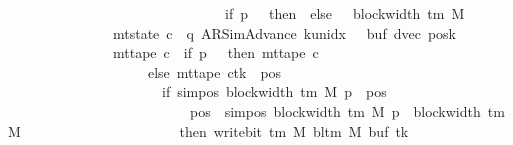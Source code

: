 \begin{isabellebody}
\ \ \ \ \ \ \ \ \ \ \ \ \ \ \ \ \ \ \ \ \ \ \ \ \ \ \ \ \ \ {\isacharcircum}{\kern0pt}{\isacharcircum}{\kern0pt}\ {\isacharparenleft}{\kern0pt}if\ p\ {\isacharequal}{\kern0pt}\ {}\ then\ {}\ else\ {}\ {\isacharasterisk}{\kern0pt}\ block{\isacharunderscore}{\kern0pt}width\ {\isacharparenleft}{\kern0pt}{\isasymGamma}{\isacharunderscore}{\kern0pt}tm\ M{\isacharparenright}{\kern0pt}{\isacharparenright}{\kern0pt}\isanewline
\ \ \ \ \ \ \ \ \ \ \ \ \ \ {\isasymand}\ mt{\isacharunderscore}{\kern0pt}state\ c{\isacharprime}{\kern0pt}{\isacharprime}{\kern0pt}\ {\isacharequal}{\kern0pt}\ {\isacharparenleft}{\kern0pt}q{\isacharcomma}{\kern0pt}\ AR{\isacharunderscore}{\kern0pt}SimAdvance{\isacharcomma}{\kern0pt}\ k{\isacharunderscore}{\kern0pt}unidx\ {}{\isacharcomma}{\kern0pt}\ {}{\isacharcomma}{\kern0pt}\ buf{\isacharcomma}{\kern0pt}\ dvec{\isacharcomma}{\kern0pt}\ posk{\isacharparenright}{\kern0pt}\isanewline
\ \ \ \ \ \ \ \ \ \ \ \ \ \ {\isasymand}\ mt{\isacharunderscore}{\kern0pt}tape\ c{\isacharprime}{\kern0pt}{\isacharprime}{\kern0pt}\ {\isacharequal}{\kern0pt}\ {\isacharparenleft}{\kern0pt}if\ p\ {\isacharequal}{\kern0pt}\ {}\ then\ mt{\isacharunderscore}{\kern0pt}tape\ c{\isacharprime}{\kern0pt}\isanewline
\ \ \ \ \ \ \ \ \ \ \ \ \ \ \ \ \ \ \ \ else\ {\isacharparenleft}{\kern0pt}mt{\isacharunderscore}{\kern0pt}tape\ c{\isacharprime}{\kern0pt}{\isacharparenright}{\kern0pt}{\isacharparenleft}{\kern0pt}tk\ {\isacharcolon}{\kern0pt}{\isacharequal}{\kern0pt}\ {\isacharparenleft}{\kern0pt}{\isasymlambda}pos{\isachardot}{\kern0pt}\isanewline
\ \ \ \ \ \ \ \ \ \ \ \ \ \ \ \ \ \ \ \ \ \ if\ sim{\isacharunderscore}{\kern0pt}pos\ {\isacharparenleft}{\kern0pt}block{\isacharunderscore}{\kern0pt}width\ {\isacharparenleft}{\kern0pt}{\isasymGamma}{\isacharunderscore}{\kern0pt}tm\ M{\isacharparenright}{\kern0pt}{\isacharparenright}{\kern0pt}\ p\ {\isasymle}\ pos\isanewline
\ \ \ \ \ \ \ \ \ \ \ \ \ \ \ \ \ \ \ \ \ \ \ \ \ {\isasymand}\ pos\ {\isacharless}{\kern0pt}\ sim{\isacharunderscore}{\kern0pt}pos\ {\isacharparenleft}{\kern0pt}block{\isacharunderscore}{\kern0pt}width\ {\isacharparenleft}{\kern0pt}{\isasymGamma}{\isacharunderscore}{\kern0pt}tm\ M{\isacharparenright}{\kern0pt}{\isacharparenright}{\kern0pt}\ p\ {\isacharplus}{\kern0pt}\ block{\isacharunderscore}{\kern0pt}width\ {\isacharparenleft}{\kern0pt}{\isasymGamma}{\isacharunderscore}{\kern0pt}tm\ M{\isacharparenright}{\kern0pt}\isanewline
\ \ \ \ \ \ \ \ \ \ \ \ \ \ \ \ \ \ \ \ \ \ then\ write{\isacharunderscore}{\kern0pt}bit\ {\isacharparenleft}{\kern0pt}{\isasymGamma}{\isacharunderscore}{\kern0pt}tm\ M{\isacharparenright}{\kern0pt}\ {\isacharparenleft}{\kern0pt}bl{\isacharunderscore}{\kern0pt}tm\ M{\isacharparenright}{\kern0pt}\ {\isacharparenleft}{\kern0pt}buf\ tk{\isacharparenright}{\kern0pt}\isanewline

\end{isabellebody}
